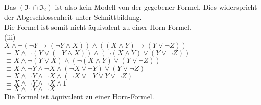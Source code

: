 \documentclass[11pt, a4paper]{article}
\begin{document}
\begin{adjustwidth}{20pt}{20pt}
Das $(\mathfrak{I_1} \cap \mathfrak{I_2})$ ist also kein Modell von der gegebener Formel. Dies widerspricht der Abgeschlossenheit unter Schnittbildung.\\
Die Formel ist somit nicht äquivalent zu einer Horn-Formel.\\
(iii)\\
$X \wedge \neg ( \neg Y \rightarrow (\neg Y \wedge X)) \wedge ((X \wedge Y)\rightarrow(Y \vee \neg Z))$\\
$\equiv X \wedge \neg ( Y \vee (\neg Y \wedge X)) \wedge (\neg (X \wedge Y)\vee(Y \vee \neg Z))$\\
$\equiv X \wedge \neg ( Y \vee X) \wedge (\neg (X \wedge Y)\vee(Y \vee \neg Z))$\\
$\equiv X \wedge \neg Y \wedge \neg X \wedge (\neg X \vee \neg Y)\vee(Y \vee \neg Z)$\\
$\equiv X \wedge \neg Y \wedge \neg X \wedge (\neg X \vee \neg Y \vee Y \vee \neg Z)$\\
$\equiv X \wedge \neg Y \wedge \neg X \wedge 1$\\
$\equiv X \wedge \neg Y \wedge \neg X$\\

Die Formel ist äquivalent zu einer Horn-Formel.


\end{adjustwidth}
\end{document}

